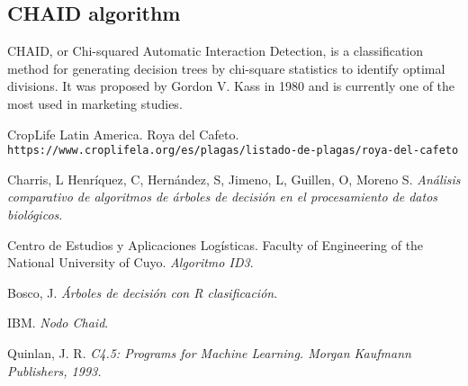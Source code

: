 \documentclass{acm_proc_article-sp}
\begin{document}
\subsection{CHAID algorithm}
CHAID, or Chi-squared Automatic Interaction Detection, is a classification method for generating decision trees by chi-square statistics to identify optimal divisions. It was proposed by Gordon V. Kass in 1980 and is currently one of the most used in marketing studies.



\begin{thebibliography}{9}

CropLife Latin America. Roya del Cafeto.
\\\texttt{https://www.croplifela.org/es/plagas/listado-de-plagas/roya-del-cafeto}

Charris, L Henríquez, C, Hernández, S, Jimeno, L, Guillen, O, Moreno S.
\textit{Análisis comparativo de algoritmos de árboles de decisión en el procesamiento de datos biológicos}.

Centro de Estudios y Aplicaciones Logísticas. Faculty of Engineering of the National University of Cuyo.
\textit{Algoritmo ID3}.

Bosco, J.
\textit{Árboles de decisión con R clasificación}.

IBM.
\textit{Nodo Chaid}.

Quinlan, J. R.
\textit{C4.5: Programs for Machine Learning. Morgan Kaufmann Publishers, 1993.}

\end{thebibliography}
\end{document}
